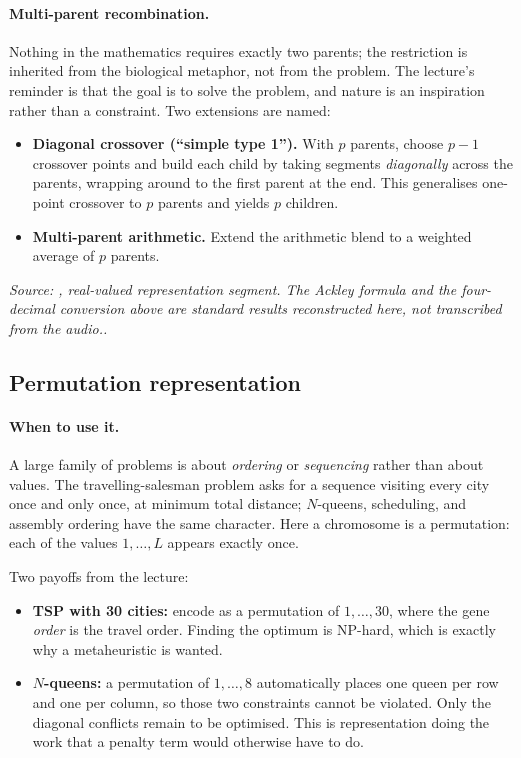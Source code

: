 \documentclass[11pt,a4paper]{article}
\newcommand{\source}[1]{\par\smallskip\noindent\textit{Source: #1.}\par\smallskip}
\begin{document}
\paragraph{Multi-parent recombination.}
Nothing in the mathematics requires exactly two parents; the restriction is
inherited from the biological metaphor, not from the problem. The lecture's
reminder is that the goal is to solve the problem, and nature is an
inspiration rather than a constraint. Two extensions are named:
\begin{itemize}
\item \textbf{Diagonal crossover (``simple type 1'').} With $p$ parents,
      choose $p-1$ crossover points and build each child by taking segments
      \emph{diagonally} across the parents, wrapping around to the first
      parent at the end. This generalises one-point crossover to $p$ parents
      and yields $p$ children.
\item \textbf{Multi-parent arithmetic.} Extend the arithmetic blend to a
      weighted average of $p$ parents.
\end{itemize}
\source{, real-valued
representation segment. The Ackley formula and the four-decimal conversion
above are standard results reconstructed here, not transcribed from the
audio.}

\subsection{Permutation representation}

\paragraph{When to use it.}
A large family of problems is about \emph{ordering} or \emph{sequencing}
rather than about values. The travelling-salesman problem asks for a sequence
visiting every city once and only once, at minimum total distance;
$N$-queens, scheduling, and assembly ordering have the same character. Here a
chromosome is a permutation: each of the values $1,\ldots,L$ appears exactly
once.

Two payoffs from the lecture:
\begin{itemize}
\item \textbf{TSP with 30 cities:} encode as a permutation of $1,\ldots,30$,
      where the gene \emph{order} is the travel order. Finding the optimum is
      NP-hard, which is exactly why a metaheuristic is wanted.
\item \textbf{$N$-queens:} a permutation of $1,\ldots,8$ automatically places
      one queen per row and one per column, so those two constraints cannot
      be violated. Only the diagonal conflicts remain to be optimised. This
      is representation doing the work that a penalty term would otherwise
      have to do.
\end{itemize}
\end{document}
